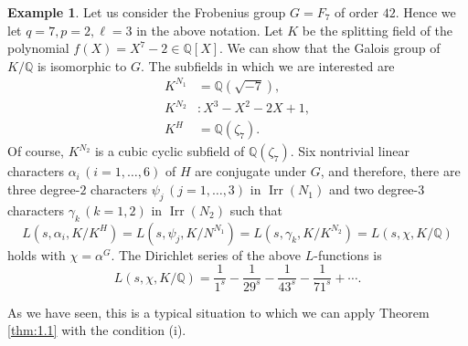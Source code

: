 \documentclass[a4paper,12pt]{article}
\newcommand{\field}[1]{\mathbb{#1}}
\newcommand{\Q}{\field{Q}}
\theoremstyle{definition}
\newtheorem{example}[theorem]{Example}
\theoremstyle{remark}
\DeclareMathOperator{\irr}{Irr}
\numberwithin{equation}{section}
\begin{document}
\begin{example}
    Let us consider the Frobenius group $G=F_7$ of order $42$.
    Hence we let $q=7, p=2, \ell =3 $ in the above notation.
    Let $K$ be the splitting field of the polynomial $f(X) =X^7 -2 \in \Q [X] $.
    We can show that the Galois group of $K/\Q$ is isomorphic to $G$.
    The subfields in which we are interested are
    \begin{align*}
        K^{N_1} & = \Q (\sqrt{-7}),\\
         K^{N_2} &:  X^3 - X^2 - 2X + 1 , \\
         K^{H} & = \Q (\zeta_7 ).
    \end{align*}
    Of course, $K^{N_2}$ is a cubic cyclic subfield of $\Q (\zeta_7)$.
        Six nontrivial linear characters $\alpha_i \, (i=1,\ldots , 6)$ of $H$ are conjugate under $G$,
    and therefore, there are three degree-$2$ characters $\psi_j \, (j=1,\ldots ,3)$ in $\irr (N_1)$ 
    and two degree-$3$ characters $\gamma_k \, (k=1,2)$ in $\irr (N_2)$ such that 
    \[
    L (s, \alpha_i, K/K^H) = L (s,\psi_j , K/N^{N_1}) = L (s, \gamma_k, K/K^{N_2})
    = L (s, \chi, K/\Q)
    \]
    holds with $\chi = \alpha^G $. The Dirichlet series of the above $L$-functions is
    \[
    L (s, \chi, K/\Q ) = \frac{1}{1^s} - \frac{1}{29^s} -\frac{1}{43^s} -\frac{1}{71^s}+ \cdots .
    \]
\end{example}

As we have seen, this is a typical situation to which we can apply Theorem \ref{thm:1.1} with the condition (i).
\end{document}
